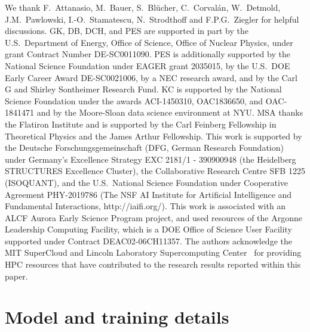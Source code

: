\documentclass[aps,prd,twocolumn,nofootinbib,superscriptaddress,preprintnumbers]{revtex4-1}
\begin{document}
\begin{acknowledgements}
We thank F.~Attanasio, M.~Bauer, S.~Bl\"ucher, C.~Corvalán, W.~Detmold, J.M.~Pawlowski, I.-O.~Stamatescu, N.~Strodthoff and F.P.G.~Ziegler for helpful discussions. GK, DB, DCH, and PES are supported in part by the U.S.\ Department of Energy, Office of Science, Office of Nuclear Physics, under grant Contract Number DE-SC0011090. PES is additionally supported by the National Science Foundation under EAGER grant 2035015, by the U.S.\ DOE Early Career Award DE-SC0021006, by a NEC research award, and by the Carl G and Shirley Sontheimer Research Fund. KC is supported by the National Science Foundation under the awards ACI-1450310, OAC1836650, and OAC-1841471 and by the Moore-Sloan data science environment at NYU. MSA thanks the Flatiron Institute and is supported by the Carl Feinberg Fellowship in Theoretical Physics and the James Arthur Fellowship. This work is supported by the Deutsche Forschungsgemeinschaft (DFG, German Research Foundation) under Germany's Excellence Strategy EXC 2181/1 - 390900948 (the Heidelberg STRUCTURES Excellence Cluster), the Collaborative Research Centre SFB 1225 (ISOQUANT), and the U.S.\ National Science Foundation under Cooperative Agreement PHY-2019786 (The NSF AI Institute for Artificial Intelligence and Fundamental Interactions, http://iaifi.org/). This work is associated with an ALCF Aurora Early Science Program project, and used resources of the Argonne Leadership Computing Facility, which is a DOE Office of Science User Facility supported under Contract DEAC02-06CH11357. The authors acknowledge the MIT SuperCloud and Lincoln Laboratory Supercomputing Center~\cite{reuther2018interactive} for providing HPC resources that have contributed to the research results reported within this paper.
\end{acknowledgements}

\vfill\null

\newpage
\appendix

\section{Model and training details}
\label{app:details}
\end{document}
